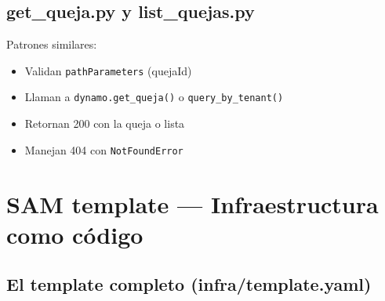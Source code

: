 \documentclass[11pt,a4paper,oneside]{article}
\begin{document}
\subsection{get\_queja.py y list\_quejas.py}

Patrones similares:
\begin{itemize}
  \item Validan \texttt{pathParameters} (quejaId)
  \item Llaman a \texttt{dynamo.get\_queja()} o \texttt{query\_by\_tenant()}
  \item Retornan 200 con la queja o lista
  \item Manejan 404 con \texttt{NotFoundError}
\end{itemize}

\section{SAM template --- Infraestructura como c\'odigo}

\subsection{El template completo (infra/template.yaml)}
\end{document}
